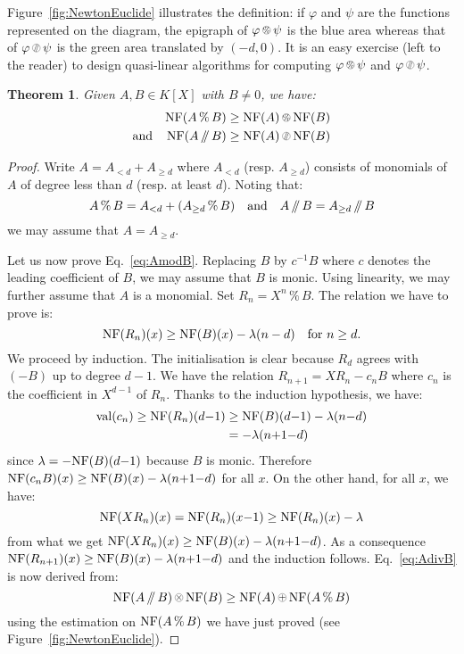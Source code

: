 \documentclass{sig-alternate-05-2015}
\DeclareMathOperator{\val}{val}
\newcommand{\NF}{\text{\rm NF}}
\renewcommand{\mod}{\,\%\,}
\renewcommand{\div}{\,/\hspace{-0.3em}/\,}
\newcommand{\nfop}[1]{%
\raisebox{-0.1mm}{\begin{tikzpicture}
\draw[transparent] (-0.18,0)--(0.18,0);
\draw[very thin] (0,0) circle (0.11cm);
\begin{scope}
\clip (0,0) circle (0.11cm);
\node[scale=0.75] at (0,0) { $#1$ };
\end{scope}
\end{tikzpicture}}}
\newcommand{\nfplus}{\nfop+}
\newcommand{\nftimes}{\nfop\times}
\newcommand{\nfmod}{\nfop\mod}
\newcommand{\nfdiv}{\nfop\div}
\newtheorem{theo}{Theorem}[section]
\theoremstyle{definition}
\begin{document}
Figure~\ref{fig:NewtonEuclide} illustrates the definition: if $\varphi$ 
and $\psi$ are the functions represented on the diagram, the epigraph of 
$\varphi \nfmod \psi$ is the blue area whereas that of $\varphi \nfdiv \psi$ 
is the green area translated by $(-d,0)$.
It is an easy exercise (left to the reader) to design quasi-linear
algorithms for computing $\varphi \nfmod \psi$ and $\varphi \nfdiv \psi$.

\begin{theo}
\label{theo:EDivisionNP}
Given $A, B \in K[X]$ with $B \neq 0$, we have:
\begin{align}
\NF(A \mod B) & \geq \NF(A) \nfmod \NF(B) \label{eq:AmodB} \\
\text{and} \hspace{4mm}
\NF(A \div B) & \geq \NF(A) \nfdiv \NF(B) \label{eq:AdivB}
\end{align}
\end{theo}

\begin{proof}
Write $A = A_{<d} + A_{\geq d}$ where $A_{<d}$ (resp. $A_{\geq d}$)
consists of monomials of $A$ of degree less than $d$ (resp. at least
$d$). Noting that:
$$A \mod B = A_{<d} + (A_{\geq d} \mod B)
\quad \text{and} \quad
A \div B = A_{\geq d} \div B$$
we may assume that $A = A_{\geq d}$.

Let us now prove Eq.~\eqref{eq:AmodB}. 
Replacing $B$ by $c^{-1} B$ where $c$ denotes the leading coefficient
of $B$, we may assume that $B$ is monic. Using linearity, we may further
assume that $A$ is a monomial. Set $R_n = X^n \mod B$. The relation
we have to prove is:
$$\NF(R_n)(x) \geq \NF(B)(x) - \lambda(n-d)
\quad \text{for } n\geq d.$$
We proceed by induction. The initialisation is clear because $R_d$
agrees with $(-B)$ up to degree $d{-}1$. We have the relation
$R_{n+1} = X R_n - c_n B$
where $c_n$ is the coefficient in $X^{d-1}$ of $R_n$. Thanks to the
induction hypothesis, we have:
\begin{align*}
\val(c_n) \geq \NF(R_n)(d{-}1) & \geq \NF(B)(d{-}1) - \lambda(n{-}d) \\
& = - \lambda(n{+}1{-}d)
\end{align*}
since $\lambda = -\NF(B)(d{-}1)$ because $B$ is monic. Therefore
$\NF(c_n B)(x) \geq \NF(B)(x) - \lambda(n{+}1{-}d)$ for all $x$. On the 
other hand, for all $x$, we have:
$$\NF(X R_n)(x) = \NF(R_n)(x{-}1) \geq \NF(R_n)(x) - \lambda$$
from what we get $\NF(X R_n)(x) \geq \NF(B)(x) - \lambda(n{+}1{-}d)$. As a
consequence
$\NF(R_{n+1})(x) \geq \NF(B)(x) - \lambda(n{+}1{-}d)$
and the induction follows.
Eq.~\eqref{eq:AdivB} is now derived from:
$$\NF(A \div B) \nftimes \NF(B) \geq \NF(A) \nfplus \NF(A \mod B)$$
using the estimation on $\NF(A\mod B)$ we have just proved
(see Figure~\ref{fig:NewtonEuclide}).
\end{proof}
\end{document}
